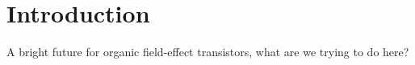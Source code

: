 \section{Introduction}
A bright future for organic field-effect transistors, what are we trying to do here?
